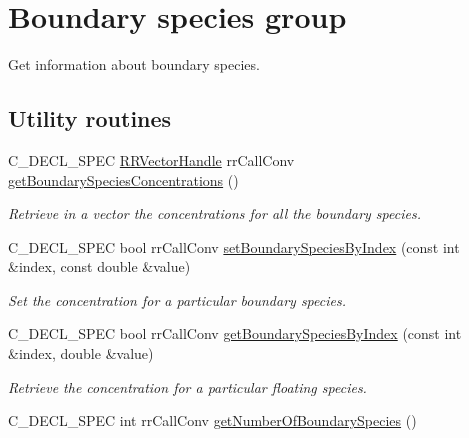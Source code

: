 \hypertarget{group__boundary}{
\section{\-Boundary species group}
\label{group__boundary}
}


\-Get information about boundary species.  


\subsection*{\-Utility routines}
\begin{DoxyCompactItemize}
\item 
\-C\-\_\-\-D\-E\-C\-L\-\_\-\-S\-P\-E\-C \hyperlink{rr__c__types_8h_aea46a16752b0ae2cd95c009030ee630e}{\-R\-R\-Vector\-Handle} \*
rr\-Call\-Conv \hyperlink{group__utility_gaae9b6b75211923bcf6f7196fe707c631}{get\-Boundary\-Species\-Concentrations} ()
\begin{DoxyCompactList}\small\item\em \-Retrieve in a vector the concentrations for all the boundary species. \end{DoxyCompactList}\item 
\-C\-\_\-\-D\-E\-C\-L\-\_\-\-S\-P\-E\-C bool rr\-Call\-Conv \hyperlink{group__utility_gabb6764fa48d0b3f2ca3b38e391479347}{set\-Boundary\-Species\-By\-Index} (const int \&index, const double \&value)
\begin{DoxyCompactList}\small\item\em \-Set the concentration for a particular boundary species. \end{DoxyCompactList}\item 
\-C\-\_\-\-D\-E\-C\-L\-\_\-\-S\-P\-E\-C bool rr\-Call\-Conv \hyperlink{group__utility_gaad04359bcaa998547d71b4cdd337796e}{get\-Boundary\-Species\-By\-Index} (const int \&index, double \&value)
\begin{DoxyCompactList}\small\item\em \-Retrieve the concentration for a particular floating species. \end{DoxyCompactList}\item 
\hypertarget{group__utility_ga17c851dfb27b9697ff286cc57d4cd10d}{
\-C\-\_\-\-D\-E\-C\-L\-\_\-\-S\-P\-E\-C int rr\-Call\-Conv \hyperlink{group__utility_ga17c851dfb27b9697ff286cc57d4cd10d}{get\-Number\-Of\-Boundary\-Species} ()}
\label{group__utility_ga17c851dfb27b9697ff286cc57d4cd10d}


\end{DoxyCompactItemize}
